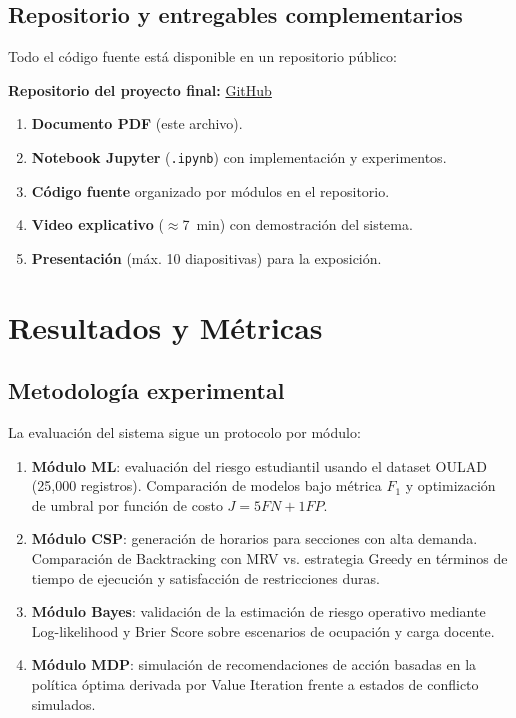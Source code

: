 \documentclass[12pt,twoside]{report}
\theoremstyle{definition}
\begin{document}
\section{Repositorio y entregables complementarios}

Todo el c\'odigo fuente est\'a disponible en un repositorio p\'ublico:
\begin{center}
\noindent\textbf{Repositorio del proyecto final:} \href{https://github.com/DanielBarillasM/Proyecto-Final_IA_Seccion_10_Grupo_1}{GitHub}
\end{center}

\begin{enumerate}[leftmargin=2em,itemsep=3pt]
  \item \textbf{Documento PDF} (este archivo).
  \item \textbf{Notebook Jupyter} (\texttt{.ipynb}) con implementaci\'on y experimentos.
  \item \textbf{C\'odigo fuente} organizado por m\'odulos en el repositorio.
  \item \textbf{Video explicativo} ($\approx$7~min) con demostraci\'on del sistema.
  \item \textbf{Presentaci\'on} (m\'ax. 10 diapositivas) para la exposici\'on.
\end{enumerate}

\chapter{Resultados y M\'etricas}
\label{ch:resultados}

\section{Metodolog\'ia experimental}

La evaluaci\'on del sistema sigue un protocolo por m\'odulo:

\begin{enumerate}[leftmargin=2em,itemsep=4pt]
  \item \textbf{M\'odulo ML}: evaluaci\'on del riesgo estudiantil usando el dataset OULAD (25,000 registros). Comparaci\'on de modelos bajo m\'etrica $F_1$ y optimizaci\'on de umbral por funci\'on de costo $J = 5FN + 1FP$.
  \item \textbf{M\'odulo CSP}: generaci\'on de horarios para secciones con alta demanda. Comparaci\'on de Backtracking con MRV vs. estrategia Greedy en términos de tiempo de ejecución y satisfacción de restricciones duras.
  \item \textbf{M\'odulo Bayes}: validaci\'on de la estimaci\'on de riesgo operativo mediante Log-likelihood y Brier Score sobre escenarios de ocupaci\'on y carga docente.
  \item \textbf{M\'odulo MDP}: simulaci\'on de recomendaciones de acci\'on basadas en la pol\'itica \'optima derivada por Value Iteration frente a estados de conflicto simulados.
\end{enumerate}
\end{document}
